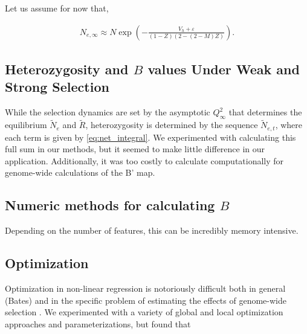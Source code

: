 \documentclass[11pt]{article}
\newcommand{\V}{\text{V}}
\begin{document}
Let us assume for now that,

\begin{align}
  \label{eq:Ne_inf}
  N_{e,\infty} \approx N \exp\left(-\frac{V_h + \varepsilon}{(1-Z) (2-(2-M) Z)} \right).
\end{align}

\subsection*{Heterozygosity and $B$ values Under Weak and Strong Selection}

While the selection dynamics are set by the asymptotic $Q_\infty^2$ that
determines the equilibrium $\widetilde{N}_e$ and $\widetilde{R}$,
heterozygosity is determined by the sequence $\widetilde{N}_{e,t}$, where each
term is given by \eqref{eq:net_integral}. We experimented with calculating this
full sum in our methods, but it seemed to make little difference in our
application. Additionally, it was too costly to calculate computationally
for genome-wide calculations of the B' map.


\subsection*{Numeric methods for calculating $B$}

Depending on the number of features, this can be incredibly memory intensive.

\subsection*{Optimization}

Optimization in non-linear regression is notoriously difficult both in general
(Bates) and in the specific problem of estimating the effects of genome-wide
selection \parencite{Murphy2022-sj}. We experimented with a variety of global
and local optimization approaches and parameterizations, but found that 



\end{document}
